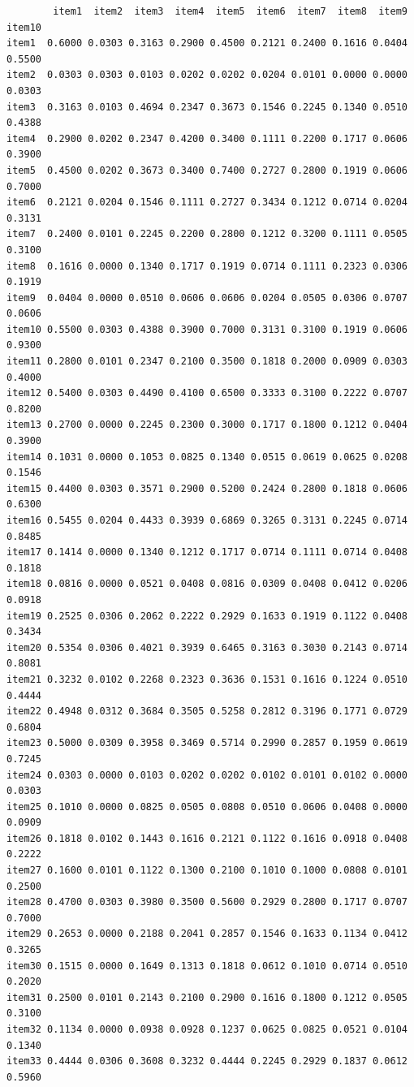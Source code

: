 \documentclass[
  a4paper,
]{ltjsbook}
\begin{document}
\begin{verbatim}
        item1  item2  item3  item4  item5  item6  item7  item8  item9 item10
item1  0.6000 0.0303 0.3163 0.2900 0.4500 0.2121 0.2400 0.1616 0.0404 0.5500
item2  0.0303 0.0303 0.0103 0.0202 0.0202 0.0204 0.0101 0.0000 0.0000 0.0303
item3  0.3163 0.0103 0.4694 0.2347 0.3673 0.1546 0.2245 0.1340 0.0510 0.4388
item4  0.2900 0.0202 0.2347 0.4200 0.3400 0.1111 0.2200 0.1717 0.0606 0.3900
item5  0.4500 0.0202 0.3673 0.3400 0.7400 0.2727 0.2800 0.1919 0.0606 0.7000
item6  0.2121 0.0204 0.1546 0.1111 0.2727 0.3434 0.1212 0.0714 0.0204 0.3131
item7  0.2400 0.0101 0.2245 0.2200 0.2800 0.1212 0.3200 0.1111 0.0505 0.3100
item8  0.1616 0.0000 0.1340 0.1717 0.1919 0.0714 0.1111 0.2323 0.0306 0.1919
item9  0.0404 0.0000 0.0510 0.0606 0.0606 0.0204 0.0505 0.0306 0.0707 0.0606
item10 0.5500 0.0303 0.4388 0.3900 0.7000 0.3131 0.3100 0.1919 0.0606 0.9300
item11 0.2800 0.0101 0.2347 0.2100 0.3500 0.1818 0.2000 0.0909 0.0303 0.4000
item12 0.5400 0.0303 0.4490 0.4100 0.6500 0.3333 0.3100 0.2222 0.0707 0.8200
item13 0.2700 0.0000 0.2245 0.2300 0.3000 0.1717 0.1800 0.1212 0.0404 0.3900
item14 0.1031 0.0000 0.1053 0.0825 0.1340 0.0515 0.0619 0.0625 0.0208 0.1546
item15 0.4400 0.0303 0.3571 0.2900 0.5200 0.2424 0.2800 0.1818 0.0606 0.6300
item16 0.5455 0.0204 0.4433 0.3939 0.6869 0.3265 0.3131 0.2245 0.0714 0.8485
item17 0.1414 0.0000 0.1340 0.1212 0.1717 0.0714 0.1111 0.0714 0.0408 0.1818
item18 0.0816 0.0000 0.0521 0.0408 0.0816 0.0309 0.0408 0.0412 0.0206 0.0918
item19 0.2525 0.0306 0.2062 0.2222 0.2929 0.1633 0.1919 0.1122 0.0408 0.3434
item20 0.5354 0.0306 0.4021 0.3939 0.6465 0.3163 0.3030 0.2143 0.0714 0.8081
item21 0.3232 0.0102 0.2268 0.2323 0.3636 0.1531 0.1616 0.1224 0.0510 0.4444
item22 0.4948 0.0312 0.3684 0.3505 0.5258 0.2812 0.3196 0.1771 0.0729 0.6804
item23 0.5000 0.0309 0.3958 0.3469 0.5714 0.2990 0.2857 0.1959 0.0619 0.7245
item24 0.0303 0.0000 0.0103 0.0202 0.0202 0.0102 0.0101 0.0102 0.0000 0.0303
item25 0.1010 0.0000 0.0825 0.0505 0.0808 0.0510 0.0606 0.0408 0.0000 0.0909
item26 0.1818 0.0102 0.1443 0.1616 0.2121 0.1122 0.1616 0.0918 0.0408 0.2222
item27 0.1600 0.0101 0.1122 0.1300 0.2100 0.1010 0.1000 0.0808 0.0101 0.2500
item28 0.4700 0.0303 0.3980 0.3500 0.5600 0.2929 0.2800 0.1717 0.0707 0.7000
item29 0.2653 0.0000 0.2188 0.2041 0.2857 0.1546 0.1633 0.1134 0.0412 0.3265
item30 0.1515 0.0000 0.1649 0.1313 0.1818 0.0612 0.1010 0.0714 0.0510 0.2020
item31 0.2500 0.0101 0.2143 0.2100 0.2900 0.1616 0.1800 0.1212 0.0505 0.3100
item32 0.1134 0.0000 0.0938 0.0928 0.1237 0.0625 0.0825 0.0521 0.0104 0.1340
item33 0.4444 0.0306 0.3608 0.3232 0.4444 0.2245 0.2929 0.1837 0.0612 0.5960

\end{verbatim}
\end{document}
